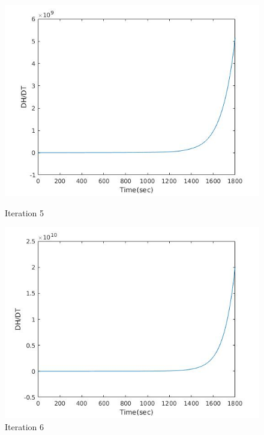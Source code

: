 \begin{figure}[h!]
  \centering
  \begin{minipage}[b]{0.4\textwidth}
    \includegraphics[width=\textwidth]{h5.jpg}
    \caption{Iteration 5}
  \end{minipage}
  \hfill
  \begin{minipage}[b]{0.4\textwidth}
    \includegraphics[width=\textwidth]{h6.jpg}
    \caption{Iteration 6}
  \end{minipage}
\end{figure}